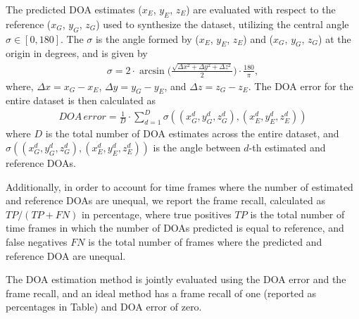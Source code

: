 \documentclass[journal]{IEEEtran}
\begin{document}
The predicted DOA estimates ($x_E$, $y_E$, $z_E$) are evaluated with respect to the reference ($x_G$, $y_G$, $z_G$) used to synthesize the dataset, utilizing the central angle $\sigma\in[0,180]$. The $\sigma$ is the angle formed by ($x_E$, $y_E$, $z_E$) and ($x_G$, $y_G$, $z_G$) at the origin in degrees, and is given by
\begin{align}
\sigma = 2\cdot\arcsin\bigg(\frac{\sqrt{\Delta x^2 + \Delta y^2 + \Delta z^2}}{2}\bigg)\cdot\frac{180}{\pi},
\end{align}
%
where, $\Delta x = x_G - x_E$, $\Delta y = y_G - y_E$, and $\Delta z = z_G - z_E$. 
The DOA error for the entire dataset is then calculated as
\begin{align}
DOA\,error =  \frac{1}{D} \cdot \sum_{d=1}^{D} \sigma((x_G^d, y_G^d, z_G^d), (x_E^d, y_E^d, z_E^d)) 
\end{align}
where $D$ is the total number of DOA estimates across the entire dataset, and $\sigma((x_G^d, y_G^d, z_G^d), (x_E^d, y_E^d, z_E^d))$ is the angle between $d$-th estimated and reference DOAs. 

Additionally, in order to account for time frames where the number of estimated and reference DOAs are unequal, we report the frame recall, calculated as $TP / (TP +  FN)$ in percentage, where true positives $TP$ is the total number of time frames in which the number of DOAs predicted is equal to reference, and false negatives $FN$ is the total number of frames where the predicted and reference DOA are unequal.

The DOA estimation method is jointly evaluated using the DOA error and the frame recall, and an ideal method has a frame recall of one (reported as percentages in Table) and DOA error of zero.
\end{document}

